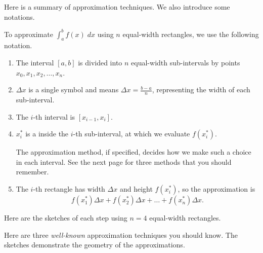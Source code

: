 \documentclass[../main.tex]{subfiles}
\begin{document}
Here is a summary of approximation techniques. We also introduce some notations.

\faStar{} To approximate \(\int_{a}^{b} f(x) \;dx\) using \(n\) equal-width rectangles, we use the following notation. \label{page:riemann-notation} 

\begin{enumerate}
  \item The interval \([a,b]\) is divided into \(n\) equal-width sub-intervals by points \(x_{0}, x_{1}, x_{2}, \dots, x_{n}\). 
  \item \(\Delta x\) is a single symbol and means \(\Delta x = \frac{b-a}{n}\), representing the width of each sub-interval.
  \item The \(i\)-th interval is \([x_{i-1}, x_{i}]\).
  \item \(x_{i}^{*}\) is a  inside the \(i\)-th sub-interval, at which we evaluate \(f(x_{i}^{*})\).

    \faExclamationTriangle{} The approximation method, if specified, decides how we make such a choice in each interval. See the next page for three methods that you should remember.

  \item The \(i\)-th rectangle has width \(\Delta x\) and height \(f(x_{i}^{*})\), so the approximation is 
    \begin{equation} \label{eq:riemann-sum-expanded}
    f(x_{1}^{*}) \Delta x + f(x_{2}^{*}) \Delta x + \dots + f(x_{n}^{*}) \Delta x.
  \end{equation}
\end{enumerate}

Here are the sketches of each step using \(n=4\) equal-width rectangles.

\begin{center}
  
  \quad
  
  \quad
  

  \medskip

  
  \qquad
  
\end{center}
\clearpage

Here are three \emph{well-known} approximation techniques you should know.  The sketches demonstrate the geometry of the approximations. 
\end{document}
